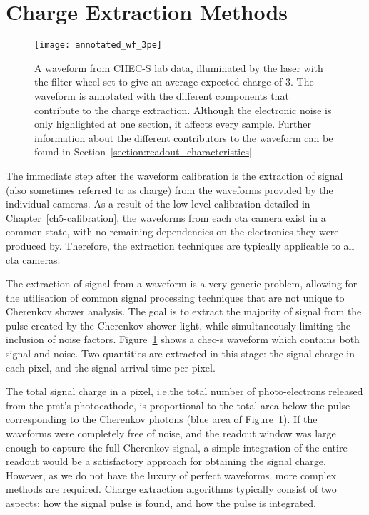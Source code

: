 \section{Charge Extraction Methods}

\begin{figure}
	\centering
    \texttt{[image: annotated\_wf\_3pe]} 
	\caption[Annotated waveform.]{A waveform from CHEC-S lab data, illuminated by the laser with the filter wheel set to give an average expected charge of \SI{3}{\pe}. The waveform is annotated with the different components that contribute to the charge extraction. Although the electronic noise is only highlighted at one section, it affects every sample. Further information about the different contributors to the waveform can be found in Section~\ref{section:readout_characteristics}}
	\label{fig:annotated_wf_3pe}
\end{figure}

The immediate step after the waveform calibration is the extraction of signal (also sometimes referred to as charge) from the waveforms provided by the individual cameras. As a result of the low-level calibration detailed in Chapter~\ref{ch5-calibration}, the waveforms from each \gls{cta} camera exist in a common state, with no remaining dependencies on the electronics they were produced by. Therefore, the extraction techniques are typically applicable to all \gls{cta} cameras. 

The extraction of signal from a waveform is a very generic problem, allowing for the utilisation of common signal processing techniques that are not unique to Cherenkov shower analysis. The goal is to extract the majority of signal from the pulse created by the Cherenkov shower light, while simultaneously limiting the inclusion of noise factors. Figure~\ref{fig:annotated_wf_3pe} shows a \gls{chec-s} waveform which contains both signal and noise. Two quantities are extracted in this stage: the signal charge in each pixel, and the signal arrival time per pixel. 

The total signal charge in a pixel, i.e.\@ the total number of photo-electrons released from the \gls{pmt}'s photocathode, is proportional to the total area below the pulse corresponding to the Cherenkov photons (blue area of Figure~\ref{fig:annotated_wf_3pe}). If the waveforms were completely free of noise, and the readout window was large enough to capture the full Cherenkov signal, a simple integration of the entire readout would be a satisfactory approach for obtaining the signal charge. However, as we do not have the luxury of perfect waveforms, more complex methods are required. Charge extraction algorithms typically consist of two aspects: how the signal pulse is found, and how the pulse is integrated.

